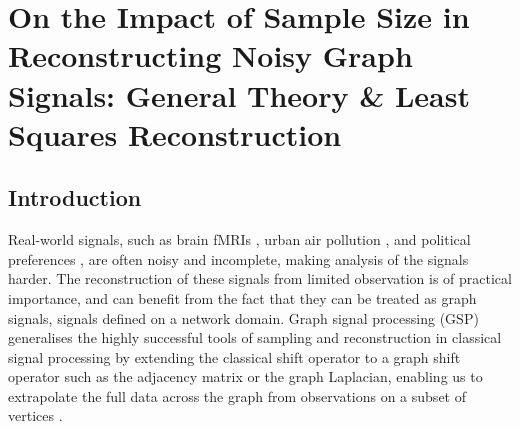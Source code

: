 
\chapter{\label{ch:proj1_LS}On the Impact of Sample Size in Reconstructing Noisy Graph Signals: General Theory \&  Least Squares Reconstruction}

\section{Introduction}
Real-world signals, such as brain fMRIs \cite{itani2021graph}, urban air pollution \cite{jain2014big}, and political preferences \cite{renoust2017estimating}, are often noisy and incomplete, making analysis of the signals harder. The reconstruction of these signals from limited observation is of practical importance, and can benefit from the fact that they can be treated as graph signals,  signals defined on a network domain. 
Graph signal processing (GSP) generalises the highly successful tools of sampling and reconstruction in classical signal processing by extending the classical shift operator to a graph shift operator \cite{ortega2018graph} such as the adjacency matrix \cite{EOptimalChen} or the graph Laplacian, enabling us to extrapolate the full data across the graph from observations on a subset of vertices \cite{tanaka2020sampling}. %

